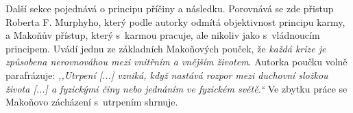 Další sekce pojednává o principu příčiny a následku. Porovnává se zde přistup
Roberta F. Murphyho, který podle autorky odmítá objektivnost principu karmy, a
Makoňův přístup, který s~karmou pracuje, ale nikoliv jako s~vládnoucím
principem. Uvádí jednu ze základních Makoňových pouček, že \textit{každá krize
je způsobena nerovnováhou mezi vnitřním a vnějším životem}. Autorka poučku volně
parafrázuje: \textit{,,Utrpení [...] vzniká, když nastává rozpor mezi duchovní
složkou života [...] a fyzickými činy nebo jednáním ve fyzickém světě.``}
Ve zbytku práce se Makoňovo zácházení s~utrpením shrnuje.


